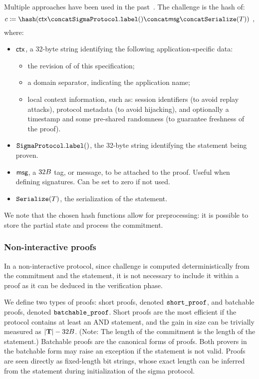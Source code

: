 \documentclass[runningheads,11pt]{article}
\begin{document}
Multiple approaches have been used in the past~\cite{EPRINT:Hamburg17, hash-to-curve}.
The challenge is the hash of:
\[
  c \defeq \hash(\ctx \concat \sigmaprotocol.\labeltt() \concat \msg \concat  \serialize(\commitment))\enspace,
\]
where:
\begin{itemize}
  \item $\mathsf{ctx}$, a 32-byte string identifying the following application-specific data:
  \begin{itemize}
    \item the revision of of this specification;
    \item a domain separator, indicating the application name;
    \item local context information, such as:
    session identifiers (to avoid replay attacks), protocol metadata (to avoid hijacking), and optionally a timestamp and some pre-shared randomness (to guarantee freshness of the proof).
  \end{itemize}
  \item $\texttt{SigmaProtocol}.\texttt{label}()$, the 32-byte string identifying the statement being proven.
  \item $\textsf{msg}$, a $32B$ tag, or message, to be attached to the proof.
  Useful when defining signatures. Can be set to zero if not used.
  \item $\texttt{Serialize}(T)$, the serialization of the statement.
\end{itemize}

We note that the chosen hash functions allow for preprocessing: it is possible to store the partial state and process the commitment.


\subsubsection{Non-interactive proofs}

In a non-interactive protocol, since challenge is computed deterministically from the commitment and the statement, it is not necessary to include it within a proof as it can be deduced in the verification phase.

We define two types of proofs: short proofs, denoted $\texttt{short\_proof}$, and batchable proofs, denoted $\texttt{batchable\_proof}$.
Short proofs are the most efficient if the protocol contains at least an AND statement, and the gain in size can be trivially measured as $|\mathbf {T}| - 32B$.
(Note: The length of the commitment is the length of the statement.)
Batchable proofs are the canonical forms of proofs.
Both provers in the batchable form may raise an exception if the statement is not valid.
Proofs are seen directly as fixed-length bit strings, whose exact length can be inferred from the statement during initialization of the sigma protocol.
\end{document}
